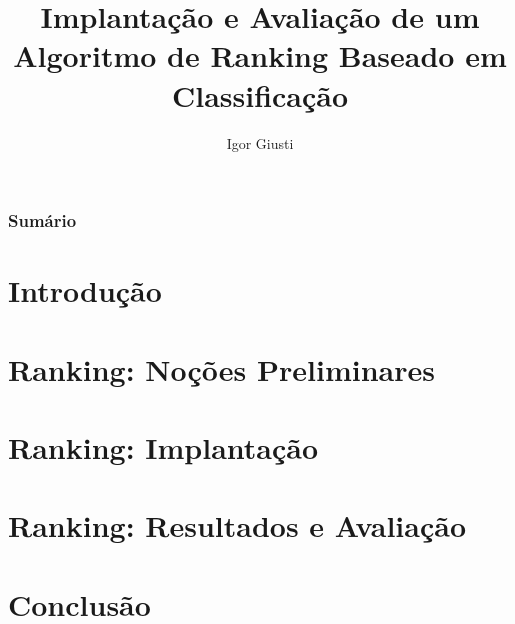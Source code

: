 \documentclass{beamer}
\title{Implantação e Avaliação de um Algoritmo de Ranking Baseado em Classificação}
\author{Igor Giusti}
\begin{document}
\frame{\titlepage}

\begin{frame}
    \frametitle{Sumário}
    \tableofcontents
\end{frame}

\section{Introdução}


\section{Ranking: Noções Preliminares}


\section{Ranking: Implantação}


\section{Ranking: Resultados e Avaliação}


\section{Conclusão}


\begin{frame}
    
\end{frame}
\end{document}
